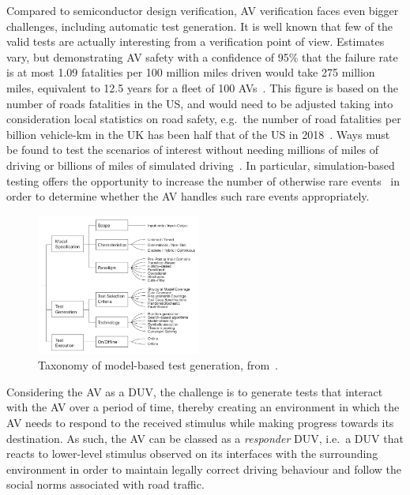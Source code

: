 \documentclass[letterpaper, 10 pt, journal, twoside]{IEEEtran}
\begin{document}
Compared to semiconductor design verification, AV verification faces even bigger challenges, including automatic test generation. It is well known that few of the valid tests are actually interesting from a verification point of view. Estimates vary, but demonstrating AV safety with a confidence of 95\% that the failure rate is at most 1.09 fatalities per 100 million miles driven would take 275 million miles, equivalent to 12.5 years for a fleet of 100 AVs~\cite{kalra2016driving}. This figure is based on the number of roads fatalities in the US, and would need to be adjusted taking into consideration local statistics on road safety, e.g.\ the number of road fatalities per billion vehicle-km in the UK has been half that of the US in 2018~\cite{ITFroadSafety2018}. Ways must be found to test the scenarios of interest without needing millions of miles of driving or billions of miles of simulated driving~\cite{korosec2019waymo}. In particular, simulation-based testing offers the opportunity to increase the number of otherwise rare events~\cite{Koopman2018} in order to determine whether the AV handles such rare events appropriately. 

\begin{figure}[!t]
	\centering
\includegraphics[width=0.48\textwidth]{taxonomy.png}
	\caption{Taxonomy of model-based test generation, from~\cite{utting2012taxonomy}.}
	\label{f:taxonomy}
\end{figure}

Considering the AV as a DUV, the challenge is to generate tests that interact with the AV over a period of time, thereby creating an environment in which the AV needs to respond to the received stimulus while making progress towards its destination. As such, the AV can be classed as a \textit{responder\/} DUV, i.e.\ a DUV that reacts to lower-level stimulus observed on its interfaces with the surrounding environment in order to maintain legally correct driving behaviour and follow the social norms associated with road traffic.
\end{document}
